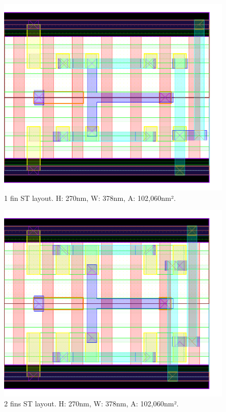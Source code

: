 \documentclass[diss,pgmicro,english]{iiufrgs}
\begin{document}
\begin{figure}[]
\centering
\includegraphics[width=\textwidth,height=\textheight,keepaspectratio]{ST1F.png}
\caption{1 fin ST layout. H: 270nm, W: 378nm, A: 102,060nm².}
\label{fig:ST1F}
\end{figure}

\begin{figure}[]
\centering
\includegraphics[width=\textwidth,height=\textheight,keepaspectratio]{ST2F.png}
\caption{2 fins ST layout. H: 270nm, W: 378nm, A: 102,060nm².}
\label{fig:ST2F}
\end{figure}
\end{document}
